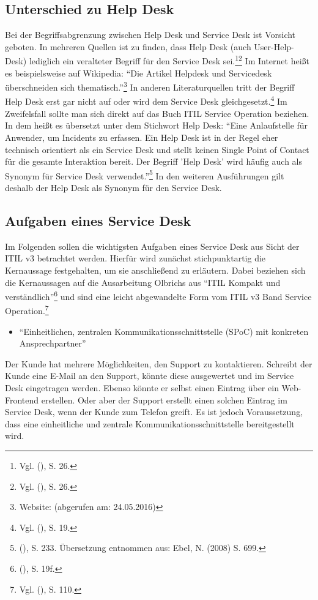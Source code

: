 \subsection{Unterschied zu Help Desk}
\noindent
Bei der Begriffsabgrenzung zwischen Help Desk und Service Desk ist Vorsicht geboten. In mehreren Quellen ist zu finden, dass Help Desk (auch User-Help-Desk) lediglich ein veralteter Begriff für den Service Desk sei.\footnote{Vgl. \citeauthor{Buchsein} (\citeyear{Buchsein}), S. 26.}\footnote{Vgl. \citeauthor{Meier} (\citeyear{Meier}), S. 26.} Im Internet heißt es beispielsweise auf Wikipedia: \enquote{Die Artikel Helpdesk und Servicedesk überschneiden sich thematisch.}\footnote{Website: \citeauthor{WikiServiceDesk} (abgerufen am: 24.05.2016)} In anderen Literaturquellen tritt der Begriff Help Desk erst gar nicht auf oder wird dem Service Desk gleichgesetzt.\footnote{Vgl. \citeauthor{Olbrich} (\citeyear{Olbrich}), S. 19.} Im Zweifelsfall sollte man sich direkt auf das Buch ITIL Service Operation beziehen. In dem heißt es übersetzt unter dem Stichwort Help Desk:
\enquote{Eine Anlaufstelle für Anwender, um Incidents zu erfassen. Ein Help Desk ist in der
Regel eher technisch orientiert als ein Service Desk und stellt keinen Single Point
of Contact für die gesamte Interaktion bereit. Der Begriff 'Help Desk' wird häufig
auch als Synonym für Service Desk verwendet.}\footnote{\citeauthor{Cannon} (\citeyear{Cannon}), S. 233. Übersetzung entnommen aus: Ebel, N. (2008) S. 699.} \newline
In den weiteren Ausführungen gilt deshalb der Help Desk als Synonym für den Service Desk.

\newpage


\subsection{Aufgaben eines Service Desk}
\noindent
Im Folgenden sollen die wichtigsten Aufgaben eines Service Desk aus Sicht der ITIL v3 betrachtet werden. Hierfür wird zunächst stichpunktartig die Kernaussage festgehalten, um sie anschließend zu erläutern. Dabei beziehen sich die Kernaussagen auf die Ausarbeitung Olbrichs aus \enquote{ITIL Kompakt und verständlich}\footnote{\citeauthor{Olbrich} (\citeyear{Olbrich}), S. 19f.}
und sind eine leicht abgewandelte Form vom ITIL v3 Band Service Operation.\footnote{Vgl. \citeauthor{Cannon} (\citeyear{Cannon}), S. 110.}

\begin{itemize}
\item \enquote{Einheitlichen, zentralen Kommunikationsschnittstelle (SPoC) mit konkreten Ansprechpartner}
\end{itemize}
\noindent
Der Kunde hat mehrere Möglichkeiten, den Support zu kontaktieren. Schreibt der Kunde eine E-Mail an den Support, könnte diese ausgewertet und im Service Desk eingetragen werden. Ebenso könnte er selbst einen Eintrag über ein Web-Frontend erstellen. Oder aber der Support erstellt einen solchen Eintrag im Service Desk, wenn der Kunde zum Telefon greift. Es ist jedoch Voraussetzung, dass eine einheitliche und zentrale Kommunikationsschnittstelle bereitgestellt wird.


